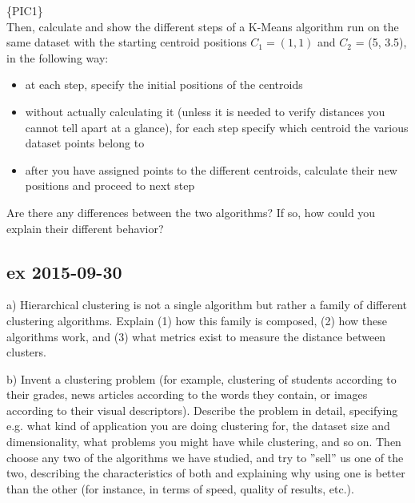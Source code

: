\documentclass[a4paper,12pt,titlepage]{article} %
\begin{document}
\{PIC1\}\\

Then, calculate and show the different steps of a K-Means algorithm run on the same dataset with the starting centroid positions $ C_{1} = (1, 1)$ and $ C_{2} $ = (5, 3.5), in the following way:
\begin{itemize}
\item at each step, specify the initial positions of the centroids
\item without actually calculating it (unless it is needed to verify distances you cannot tell apart at a glance), for each step specify which centroid the various dataset points belong to
\item after you have assigned points to the different centroids, calculate their new positions and proceed to next step
\end{itemize}
Are there any differences between the two algorithms? If so, how could you explain their different behavior?

\subsection{ex 2015-09-30}
a) Hierarchical clustering is not a single algorithm but rather a family of different clustering algorithms. Explain (1) how this family is composed, (2) how these algorithms work, and (3) what metrics exist to measure the distance between clusters.

b) Invent a clustering problem (for example, clustering of students according to their grades, news articles according to the words they contain, or images according to their visual descriptors). Describe the problem in detail, specifying e.g. what kind of application you are doing clustering for, the dataset size and dimensionality, what problems you might have while clustering, and so on. Then choose any two of the algorithms we have studied, and try to ”sell” us one of the two, describing the characteristics of both and explaining why using one is better than the other (for instance, in terms of speed, quality of results, etc.).

\end{document}
